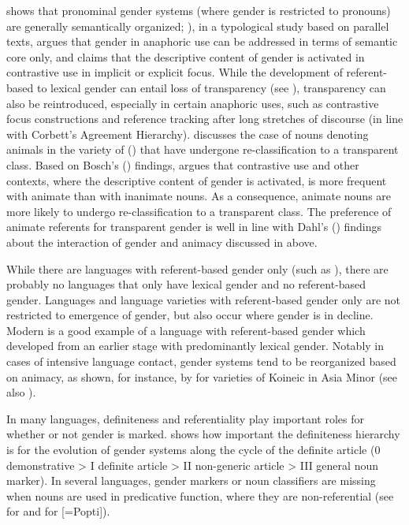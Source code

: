 \documentclass[output=collectionpaper]{langsci/langscibook}
\begin{document}
\cite{Audring2009a} shows that pronominal gender systems (where gender is restricted to pronouns) are generally semantically organized; ), in a typological study based on parallel texts, argues that gender in anaphoric use can be addressed in terms of semantic core only, and \cite[227]{Bosch1988} claims that the descriptive content of gender is activated in contrastive use in implicit or explicit focus. While the development of referent-based to lexical gender can entail loss of transparency (see ), transparency can also be reintroduced, especially in certain anaphoric uses, such as contrastive focus constructions and reference tracking after long stretches of discourse (in line with Corbett's Agreement Hierarchy). \cite[24]{Seifart2018} discusses the case of nouns denoting animals in the  variety of  () that have undergone re-classification to a transparent class. Based on Bosch's (\citeyear{Bosch1988}) findings, \cite{Seifart2018} argues that contrastive use and other contexts, where the descriptive content of gender is activated, is more frequent with animate than with inanimate nouns. As a consequence, animate nouns are more likely to undergo re-classification to a transparent class. The preference of animate referents for transparent gender is well in line with Dahl's (\citeyear{Dahl2000a}) findings about the interaction of gender and animacy discussed in  above.

While there are languages with referent-based gender only (such as ), there are probably no languages that only have lexical gender and no referent-based gender. Languages and language varieties with referent-based gender only are not restricted to emergence of gender, but also occur where gender is in decline. Modern  is a good example of a language with referent-based gender which developed from an earlier stage with predominantly lexical gender. Notably in cases of intensive language contact, gender systems tend to be reorganized based on animacy, as shown, for instance, by \cite{Karatsareas2014} for varieties of Koineic  in Asia Minor (see also ).

In many languages, definiteness and referentiality play important roles for whether or not gender is marked. \cite{Greenberg1978} shows how important the definiteness hierarchy is for the evolution of gender systems along the cycle of the definite article (0 demonstrative > I definite article > II non-generic article > III general noun marker). In several languages, gender markers or noun classifiers are missing when nouns are used in predicative function, where they are non-referential (see \citealt[110--111]{Fedden2011} for  and \citealt[330]{Craig1977} for  [=Popti\textquotesingle{}]).
\end{document}
